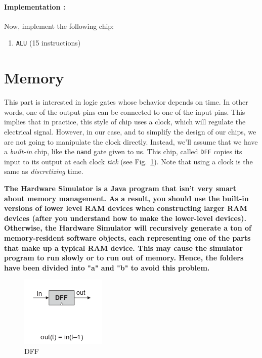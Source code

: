 \documentclass[11pt]{article}
\begin{document}
\paragraph{Implementation :} Now, implement the following chip:
\begin{enumerate}
\item \texttt{ALU} (15 instructions)
\end{enumerate}

\section{Memory}
\label{sec:memory}

This part is interested in logic gates whose behavior depends on time. In other words, one of the output pins can be connected to one of the input pins. This implies that in practice, this style of chip uses a clock, which will regulate the electrical signal. However, in our case, and to simplify the design of our chips, we are not going to manipulate the clock directly. Instead, we'll assume that we have a \textit{built-in} chip, like the \texttt{nand} gate given to us. This chip, called \texttt{DFF} copies its input to its output at each clock \textit{tick} (see Fig.~\ref{fig:dff}). Note that using a clock is the same as \textit{discretizing} time.

\textbf{The Hardware Simulator is a Java program that isn’t very smart about memory management.  As a result, you should use the built-in versions of lower level RAM devices when constructing larger RAM devices (after you understand how to make the lower-level devices). Otherwise, the Hardware Simulator will recursively generate a ton of memory-resident software objects, each representing one of the parts that make up a typical RAM device. This may cause the simulator program to run slowly or to run out of memory. Hence, the folders have been divided into "a" and "b" to avoid this problem.}


\begin{figure}[h!]
  \centering
  \label{fig:dff}
  \includegraphics{pictures/dff.png}
  \caption{DFF}
\end{figure}
\end{document}
